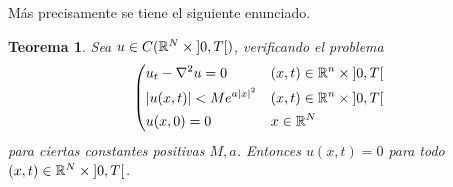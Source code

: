 \documentclass{article}
\newcommand{\realNumbers}{\mathbb{R}}
\newtheorem{theorem}{Teorema}
\theoremstyle{definition}
\theoremstyle{remark}
\newcommand{\leftOpenInterval}{\left]}
\newcommand{\rightOpenInterval}{\right[}
\newcommand{\leftClosedInterval}{\left[}
\newcommand{\rightClosedInterval}{\right]}
\newcommand{\interval}[3]{%
  \ifstrequal{#1}{oo}{%
    \leftOpenInterval #2, #3 \rightOpenInterval%
  }{%
    \ifstrequal{#1}{co}{%
      \leftClosedInterval #2, #3 \rightOpenInterval%
    }{%
      \ifstrequal{#1}{oc}{
        \leftOpenInterval #2, #3 \rightClosedInterval%
      }{%
        \ifstrequal{#1}{cc}{
          \leftClosedInterval #2, #3 \rightClosedInterval
        }{%
        }%
      }%
    }%
  }%
}
\begin{document}
  Más precisamente se tiene el siguiente enunciado.

  \begin{theorem}
    Sea \(u \in C(\realNumbers^N \times \interval{oo}{0}{T})\), verificando el problema
    \begin{align}
      \left(
        \begin{aligned}        
          &u_t - \laplacian u = 0
            && (x, t) \in \realNumbers^n \times \interval{oo}{0}{T}
          \\
          & \abs{u(x, t)} < M e^{a \abs{x}^2}
            && (x, t) \in \realNumbers^n \times \interval{oo}{0}{T}
          \\
          &u(x, 0) = 0
            && x \in \realNumbers^N
        \end{aligned}
      \right.
    \end{align}
    para ciertas constantes positivas \(M, a\).
    Entonces \(u(x, t) = 0\) para todo \((x, t) \in \realNumbers^N \times \interval{oo}{0}{T}\).
  \end{theorem}
\end{document}
